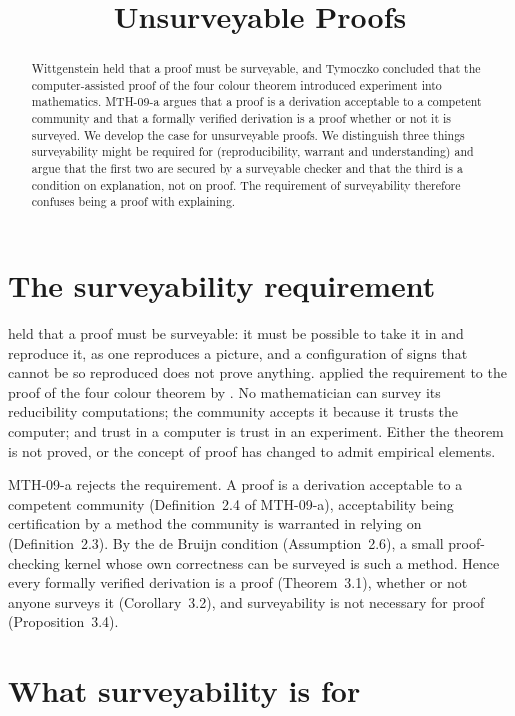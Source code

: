 \documentclass{situationist-preprint}
\title{Unsurveyable Proofs}
\begin{document}
\maketitle

\begin{abstract}
Wittgenstein held that a proof must be surveyable, and Tymoczko concluded that the computer-assisted proof of the four colour theorem introduced experiment into mathematics. MTH-09-a argues that a proof is a derivation acceptable to a competent community and that a formally verified derivation is a proof whether or not it is surveyed. We develop the case for unsurveyable proofs. We distinguish three things surveyability might be required for (reproducibility, warrant and understanding) and argue that the first two are secured by a surveyable checker and that the third is a condition on explanation, not on proof. The requirement of surveyability therefore confuses being a proof with explaining.
\end{abstract}

\section{The surveyability requirement}

\citet[Part III]{Wittgenstein1956} held that a proof must be surveyable: it must be possible to take it in and reproduce it, as one reproduces a picture, and a configuration of signs that cannot be so reproduced does not prove anything. \citet{Tymoczko1979} applied the requirement to the proof of the four colour theorem by \citet{AppelHaken1977}. No mathematician can survey its reducibility computations; the community accepts it because it trusts the computer; and trust in a computer is trust in an experiment. Either the theorem is not proved, or the concept of proof has changed to admit empirical elements.

MTH-09-a rejects the requirement. A proof is a derivation acceptable to a competent community (Definition~2.4 of MTH-09-a), acceptability being certification by a method the community is warranted in relying on (Definition~2.3). By the de Bruijn condition (Assumption~2.6), a small proof-checking kernel whose own correctness can be surveyed is such a method. Hence every formally verified derivation is a proof (Theorem~3.1), whether or not anyone surveys it (Corollary~3.2), and surveyability is not necessary for proof (Proposition~3.4).

\section{What surveyability is for}
\end{document}
